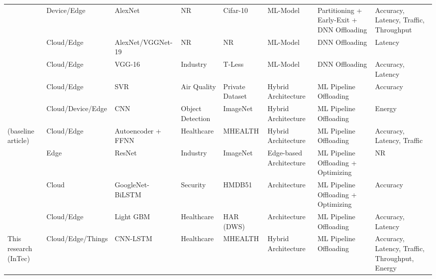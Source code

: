 \documentclass[11pt]{article}
\begin{document}
\begin{landscape}
\begin{longtable}{@{}p{1.5cm}p{3.5cm}p{2.5cm}p{2.5cm}p{2.5cm}p{3cm}p{5cm}p{2.2cm}@{}}
			\cite{c14} & Device/Edge & AlexNet & NR & Cifar-10 & ML-Model & Partitioning + Early-Exit + DNN Offloading & Accuracy, Latency, Traffic, Throughput \\
			\cite{c29} & Cloud/Edge & AlexNet/VGGNet-19 & NR & NR & ML-Model & DNN Offloading & Latency \\
			\cite{c37} & Cloud/Edge & VGG-16 & Industry & T-Less & ML-Model & DNN Offloading & Accuracy, Latency \\
			\cite{c32} & Cloud/Edge & SVR & Air Quality & Private Dataset & Hybrid Architecture & ML Pipeline Offloading & Accuracy \\
			\cite{c31} & Cloud/Device/Edge & CNN & Object Detection & ImageNet & Hybrid Architecture & ML Pipeline Offloading & Energy \\
			\cite{c15}  (baseline article) & Cloud/Edge & Autoencoder + FFNN & Healthcare & MHEALTH & Hybrid Architecture & ML Pipeline Offloading & Accuracy, Latency, Traffic \\
			\cite{c33} & Edge & ResNet & Industry & ImageNet & Edge-based Architecture & ML Pipeline Offloading + Optimizing & NR \\
			\cite{c16} & Cloud & GoogleNet-BiLSTM & Security & HMDB51 & Architecture & ML Pipeline Offloading + Optimizing & Accuracy \\
			\cite{c17} & Cloud/Edge & Light GBM & Healthcare & HAR (DWS) & Architecture & ML Pipeline Offloading & Accuracy, Latency \\
			This research (InTec) & Cloud/Edge/Things & CNN-LSTM & Healthcare & MHEALTH & Hybrid Architecture & ML Pipeline Offloading & Accuracy, Latency, Traffic, Throughput, Energy \\
		\end{longtable}
		

\end{landscape}
\end{document}
